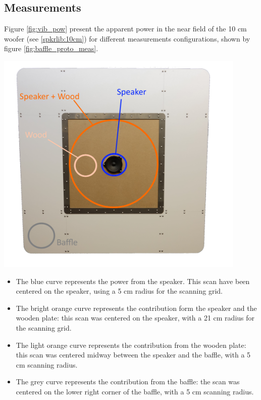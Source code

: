 \documentclass{report}
\begin{document}
\subsection{Measurements}

Figure \ref{fig:vib_pow} present the apparent power in the near field of the 10 cm woofer (see \ref{spkrlib:10cm}) for different measurements configurations, shown by figure \ref{fig:baffle_proto_meas}.

\vspace{0.5cm}

\begin{minipage}{0.3\textwidth}
\begin{center}
	\includegraphics[width=0.9\textwidth]{GridOpti/Baffle_meas_Points} 
    \captionsetup{hypcap=false} 
	\label{fig:baffle_proto_meas}
\end{center}
\end{minipage}
\begin{minipage}{0.7\textwidth}

\begin{itemize}
\item The blue curve represents the power from the speaker. This scan have been centered on the speaker, using a 5 cm radius for the scanning grid. 
\item The bright orange curve represents the contribution form the speaker and the wooden plate: this scan was centered on the speaker, with a 21 cm radius for the scanning grid.
\item The light orange curve represents the contribution from the wooden plate: this scan was centered midway between the speaker and the baffle, with a 5 cm scanning radius. 
\item  The grey curve represents the contribution from the baffle: the scan was centered on the lower right corner of the baffle, with a 5 cm scanning radius. 
\end{itemize}
\end{minipage}
\end{document}

